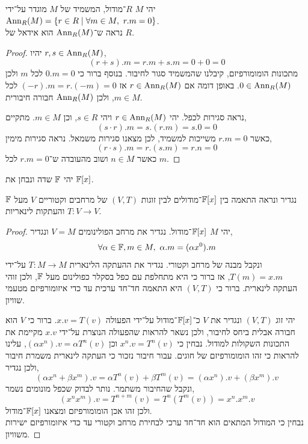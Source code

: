 \question{}
יהי $M$ $R$־מודול, המשמיד של $M$ מוגדר על־ידי $\operatorname{Ann}_R(M) = \{ r \in R \mid \forall m \in M,\ r . m = 0 \}$. \\
נראה ש־$\operatorname{Ann}_R(M)$ הוא אידאל של $R$.
\begin{proof}
	יהיו $r, s \in \operatorname{Ann}_R(M)$,
	\[
		(r + s) . m
		= r . m + s . m
		= 0 + 0
		= 0
	\]
	מתכונות הומומורפיזם, קיבלנו שהמשמיד סגור לחיבור.
	בנוסף ברור כי $0 . m = 0$ לכל $m$ ולכן $0 \in \operatorname{Ann}_R(M)$.
	באופן דומה אם $r \in \operatorname{Ann}_R(M)$ אז $(-r) . m = r . (-m) = 0$ לכל $m \in M$, ולכן $\operatorname{Ann}_R(M)$ חבורה חיבורית.

	נראה סגירות לכפל.
	יהי $r \in \operatorname{Ann}_R(M)$ ויהי $s \in R$, וכן $m \in M$.
	מתקיים,
	\[
		(s \cdot r) . m
		= s . (r . m)
		= s . 0
		= 0
	\]
	כאשר $r . m = 0$ משייכות למשמיד, לכן מצאנו סגירות משמאל.
	נראה סגירות מימין,
	\[
		(r \cdot s) . m
		= r . (s . m)
		= r . n
		= 0
	\]
	כאשר $n \in M$ ושוב מהעובדה ש־$r . m = 0$ לכל $m$.
\end{proof}

\question{}
יהי $\mathbb{F}$ שדה ונבחן את $\mathbb{F}[x]$.

\subquestion{}
נגדיר ונראה התאמה בין $\mathbb{F}[x]$־מודולים לבין זוגות $(V, T)$ של מרחבים וקטוריים $V$ מעל $\mathbb{F}$ והעתקות לינאריות $T : V \to V$.
\begin{proof}
	יהי $M$ $\mathbb{F}[x]$־מודול.
	נגדיר את מרחב הפולינומים $V = M$ ונגדיר,
	\[
		\forall \alpha \in \FF, m \in M,\ 
		\alpha . m
		= (\alpha x^0) . m
	\]
	ונקבל מבנה של מרחב וקטורי.
	נגדיר את ההעתקה הלינארית $T : M \to M$ על־ידי $T(m) = x . m$, אז ברור כי היא מתחלפת עם כפל בסקלר כפולינום מעל $\mathbb{F}$, ולכן זוהי העתקה לינארית.
	ברור כי $(V, T)$ היא התאמה חד־חד ערכית עד כדי איזומורפיזם מטעמי שוויון.

	יהי זוג $(V, T)$ ונגדיר את $V$ כ־$\mathbb{F}[x]$־מודול על־ידי הפעולה $x . v = T(v)$. ברור כי $V$ הוא חבורה אבלית ביחס לחיבור, ולכן נשאר להראות שהפעולה הנוצרת על־ידי $x . v$ מקיימת את התכונות השקולות למודול.
	נבחין כי $x^n . v = T^n(v)$ וכן $(\alpha x^n) . v = \alpha T^n(v)$, עלינו להראות כי זהו הומומורפיזם של חוגים.
	עבור חיבור נזכור כי העתקה לינארית משמרת חיבור ולכן נגדיר,
	\[
		(\alpha x^n + \beta x^m) . v
		= \alpha T^n(v) + \beta T^m(v)
		= (\alpha x^n) . v + (\beta x^m) . v
	\]
	ונקבל שהחיבור משתמר.
	נותר לבדוק שכפל מונומים נשמר,
	\[
		(x^n x^m) . v
		= T^{n + m}(v)
		= T^n(T^m(v))
		= x^n . x^m . v
	\]
	ולכן זהו אכן הומומורפיזם ומצאנו $\mathbb{F}[x]$־מודול. \\
	נבחין כי המודול המתאים הוא חד־חד ערכי לבחירת מרחב וקטורי עד כדי איזומורפיזם ישירות משוויון.
\end{proof}

